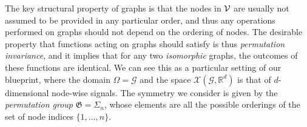 The key structural property of graphs is that the nodes in ${\mathcal{V}}$ are usually not assumed to be provided in any particular order, and thus any operations performed on graphs should not depend on the ordering of nodes. The desirable property  that functions acting on graphs should satisfy is thus {\em permutation invariance}, and it implies that for any two \emph{isomorphic} graphs,  the outcomes of these functions are identical. 
%
%
We can see this as a 
particular setting of our blueprint, where the domain $\Omega = \mathcal{G}$ and the space $\mathcal{X}(\mathcal{G},\mathbb{R}^d)$ is that of $d$-dimensional node-wise signals. 
%
The symmetry we consider is given by the \emph{permutation group} $\mathfrak{G} = \Sigma_n$, whose elements are all the possible orderings of the set of node indices $\{1,\hdots, n\}$. 





%



